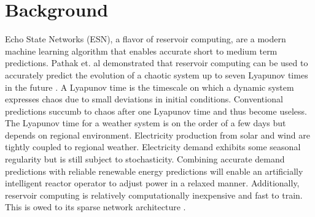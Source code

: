 \section{Background}

Echo State Networks (ESN), a flavor of reservoir computing, are a modern
machine learning algorithm that enables accurate short
to medium term predictions. Pathak et. al demonstrated that reservoir computing
can be used to accurately predict the evolution of a chaotic system up to seven
Lyapunov times in the
future \cite{pathak_model-free_2018, wikner_combining_2020}. A Lyapunov time is
the timescale on which a dynamic system expresses chaos
due to small deviations in initial conditions. Conventional predictions succumb
to chaos after one Lyapunov time and thus become useless. The Lyapunov time for
a weather system is on the order of a few days but depends on regional
environment.
Electricity production from solar and wind are tightly coupled to regional
weather. Electricity demand exhibits some seasonal regularity but is still
subject to stochasticity. Combining accurate demand predictions with reliable
renewable energy predictions will enable an artificially intelligent reactor
operator to adjust power in a relaxed manner. Additionally, reservoir computing
is relatively computationally inexpensive and fast to train. This is owed to its
sparse network architecture \cite{pathak_model-free_2018,
wikner_combining_2020, vannitsem_predictability_2017}.
